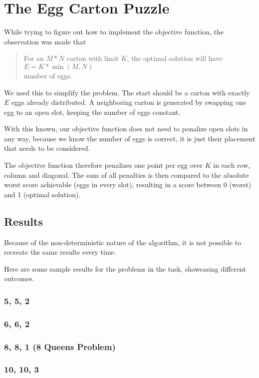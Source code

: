 \section*{The Egg Carton Puzzle}
While trying to figure out how to implement the objective function, the observation was made that
\begin{quote}
    For an $M*N$ carton with limit $K$, the optimal solution will have \\
    $E = K * \min (M, N)$\\
    number of eggs.
\end{quote}
We used this to simplify the problem.
The start should be a carton with exactly $E$ eggs already distributed.
A neighboring carton is generated by swapping one egg to an open slot,
keeping the number of eggs constant.

With this known, our objective function does not need to penalize open slots in any way,
because we know the number of eggs is correct, it is just their placement that needs to be considered.

The objective function therefore penalizes one point per egg over $K$ in each row, column and diagonal.
The sum of all penalties is then compared to the absolute worst score achievable (eggs in every slot),
resulting in a score between 0 (worst) and 1 (optimal solution).

\newpage
\subsection*{Results}
Because of the non-deterministic nature of the algorithm,
it is not possible to recreate the same results every time.

Here are some sample results for the problems in the task,
showcasing different outcomes.

\subsubsection*{5, 5, 2}


\subsubsection*{6, 6, 2}


\newpage

\subsubsection*{8, 8, 1 (8 Queens Problem)}


\subsubsection*{10, 10, 3}

